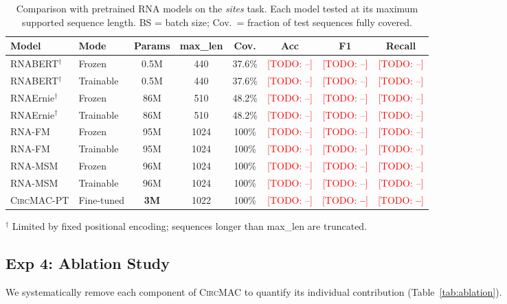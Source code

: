 \documentclass[10pt,twocolumn]{article}
\newcommand{\todo}[1]{\textcolor{red}{[TODO: #1]}}
\newcommand{\circmac}{\textsc{CircMAC}}
\begin{document}
\begin{table}[ht]
\centering
\caption{Comparison with pretrained RNA models on the \emph{sites} task.
Each model tested at its maximum supported sequence length.
BS = batch size; Cov.\ = fraction of test sequences fully covered.}
\label{tab:exp3}
\begin{tabular}{llcccccc}
\toprule
\textbf{Model} & \textbf{Mode} & \textbf{Params} & \textbf{max\_len} & \textbf{Cov.}
  & \textbf{Acc} & \textbf{F1} & \textbf{Recall} \\
\midrule
RNABERT$^\dagger$  & Frozen      & 0.5M  & 440  & 37.6\% & \todo{--} & \todo{--} & \todo{--} \\
RNABERT$^\dagger$  & Trainable   & 0.5M  & 440  & 37.6\% & \todo{--} & \todo{--} & \todo{--} \\
RNAErnie$^\dagger$ & Frozen      & 86M   & 510  & 48.2\% & \todo{--} & \todo{--} & \todo{--} \\
RNAErnie$^\dagger$ & Trainable   & 86M   & 510  & 48.2\% & \todo{--} & \todo{--} & \todo{--} \\
RNA-FM             & Frozen      & 95M   & 1024 & 100\%  & \todo{--} & \todo{--} & \todo{--} \\
RNA-FM             & Trainable   & 95M   & 1024 & 100\%  & \todo{--} & \todo{--} & \todo{--} \\
RNA-MSM            & Frozen      & 96M   & 1024 & 100\%  & \todo{--} & \todo{--} & \todo{--} \\
RNA-MSM            & Trainable   & 96M   & 1024 & 100\%  & \todo{--} & \todo{--} & \todo{--} \\
\midrule
\circmac{}-PT      & Fine-tuned  & \textbf{3M} & 1022 & 100\%
  & \todo{--} & \todo{\textbf{--}} & \todo{\textbf{--}} \\
\bottomrule
\end{tabular}
\begin{flushleft}
\small $^\dagger$ Limited by fixed positional encoding; sequences longer
than max\_len are truncated.
\end{flushleft}
\end{table}

\subsection{Exp 4: Ablation Study}
\label{sec:exp4}

We systematically remove each component of \circmac{} to quantify
its individual contribution (Table~\ref{tab:ablation}).
\end{document}
